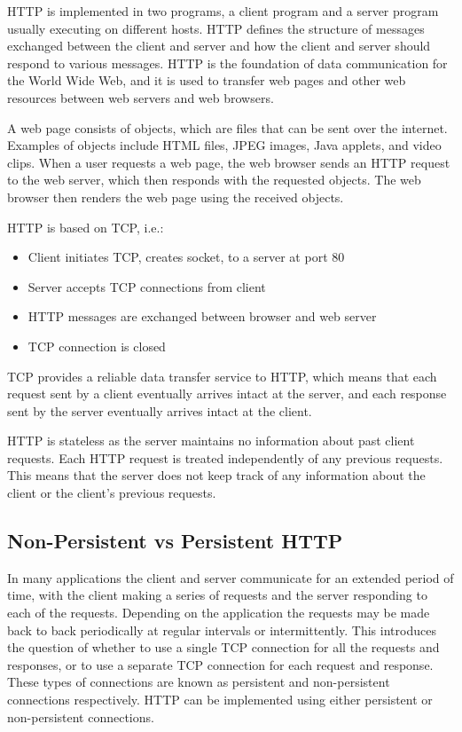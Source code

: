\documentclass[12pt letter]{report}
\begin{document}
HTTP is implemented in two programs, a client program and a server
program usually executing on different hosts. HTTP defines the
structure of messages exchanged between the client and server and how
the client and server should respond to various messages. HTTP is the
foundation of data communication for the World Wide Web, and it is
used to transfer web pages and other web resources between web
servers and web browsers.

A web page consists of objects, which are files that can be sent over
the internet. Examples of objects include HTML files, JPEG images,
Java applets, and video clips. When a user requests a web page, the
web browser sends an HTTP request to the web server, which then
responds with the requested objects. The web browser then renders the
web page using the received objects.

HTTP is based on TCP, i.e.:
\begin{itemize}
  \item Client initiates TCP, creates socket, to a server at port 80
  \item Server accepts TCP connections from client
  \item HTTP messages are exchanged between browser and web server
  \item TCP connection is closed
\end{itemize}

TCP provides a reliable data transfer service to HTTP, which means that
each request sent by a client eventually arrives intact at the
server, and each response sent by the server eventually arrives
intact at the client.

HTTP is stateless as the server maintains no information about past
client requests. Each HTTP request is treated independently of any
previous requests. This means that the server does not keep track of
any information about the client or the client's previous requests.

\subsection{Non-Persistent vs Persistent HTTP}

In many applications the client and server communicate for an
extended period of time, with the client making a series of requests
and the server responding to each of the requests. Depending on the
application the requests may be made back to back periodically at
regular intervals or intermittently. This introduces the question of
whether to use a single TCP connection for all the requests and
responses, or to use a separate TCP connection for
each request and response. These types of connections are known as
persistent and non-persistent connections respectively. HTTP can be
implemented using either persistent or non-persistent connections.
\end{document}
